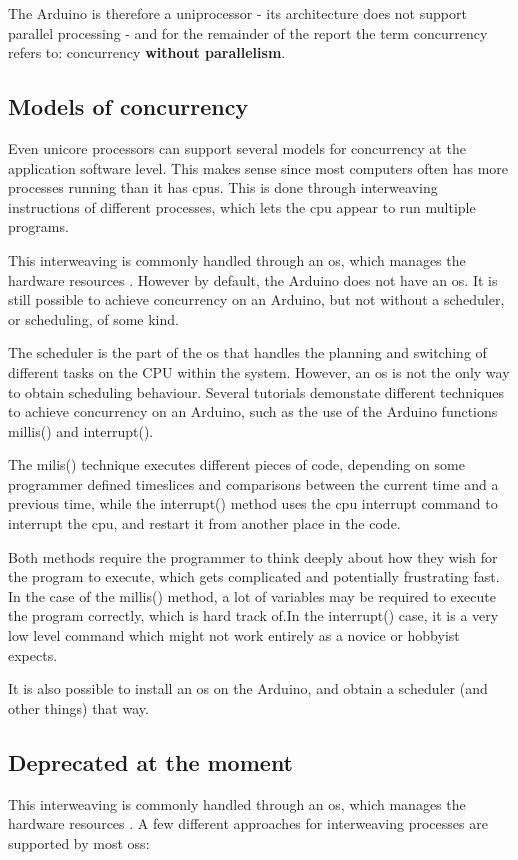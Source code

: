 The Arduino is therefore a uniprocessor\cite{Bryant2016} - its architecture does not support parallel processing - and for the remainder of the report the term concurrency refers to: concurrency \textbf{without parallelism}.

\subsection{Models of concurrency}\label{subsec:modelsofcon}
Even unicore processors can support several models for concurrency at the application software level. This makes sense since most computers often has more processes running than it has \glspl{cpu}. This is done through interweaving instructions of different processes, which lets the \gls{cpu} appear to run multiple programs.

This interweaving is commonly handled through an \gls{os}, which manages the hardware resources \cite{Bryant2016}. However by default, the Arduino does not have an \gls{os}. It is still possible to achieve concurrency on an Arduino, but not without a scheduler, or scheduling, of some kind.

The scheduler is the part of the \gls{os} that handles the planning and switching of different tasks on the CPU within the system. However, an \gls{os} is not the only way to obtain scheduling behaviour. Several tutorials  demonstate different techniques to achieve concurrency on an Arduino, such as the use of the Arduino functions millis() and interrupt().

The milis() technique executes different pieces of code, depending on some programmer defined timeslices and comparisons between the current time and a previous time, while the interrupt() method uses the \gls{cpu} interrupt command to interrupt the \gls{cpu}, and restart it from another place in the code.

Both methods require the programmer to think deeply about how they wish for the program to execute, which gets complicated and potentially frustrating fast. In the case of the millis() method, a lot of variables may be required to execute the program correctly, which is hard track of.In the interrupt() case, it is a very low level command which might not work entirely as a novice or hobbyist expects.

It is also possible to install an \gls{os} on the Arduino, and obtain a scheduler (and other things) that way.

\subsection*{Deprecated at the moment}
This interweaving is commonly handled through an \gls{os}, which manages the hardware resources \cite{Bryant2016}. A few different approaches for interweaving processes are supported by most \glspl{os}: 

